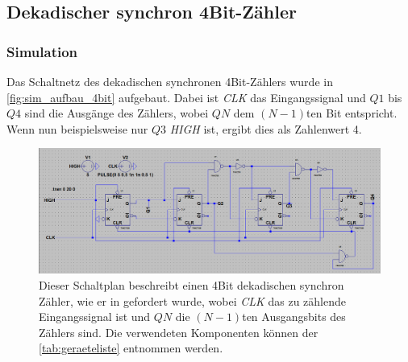 \documentclass[12pt,english,ngerman]{scrartcl}
\begin{document}




\subsection{Dekadischer synchron 4Bit-Zähler}
\subsubsection{Simulation}

Das Schaltnetz des dekadischen synchronen 4Bit-Zählers wurde in
\autoref{fig:sim_aufbau_4bit} aufgebaut. Dabei ist \textit{CLK} das Eingangssignal
und $Q1$ bis $Q4$ sind die Ausgänge des Zählers, wobei $QN$ dem $(N-1)$ten Bit
entspricht. Wenn nun beispielsweise nur $Q3$ \textit{HIGH} ist, ergibt dies als Zahlenwert 4.

\begin{figure}[H]
  \centering
    \includegraphics[width=\linewidth]{./figures/sim/4bit/aufbau4bit.png}
    \caption{Dieser Schaltplan beschreibt einen 4Bit dekadischen synchron
      Zähler, wie er in  gefordert wurde, wobei
      \textit{CLK} das zu zählende Eingangssignal ist und $QN$ die $(N-1)$ten
      Ausgangsbits des Zählers sind. Die verwendeten Komponenten können der
      \autoref{tab:geraeteliste} entnommen werden.}
  \label{fig:sim_aufbau_4bit}
\end{figure}
\end{document}
